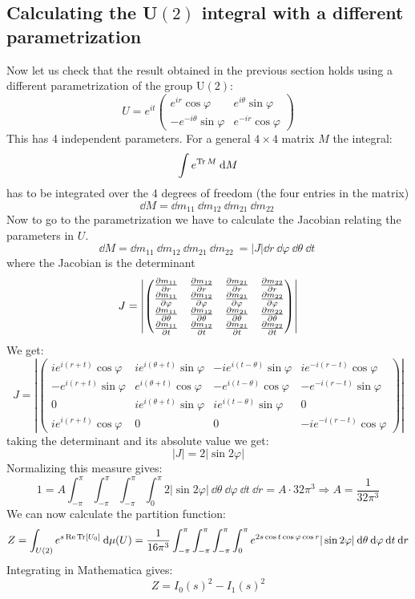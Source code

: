 \documentclass[a4,10pt,titlepage]{article}
\renewcommand\[{\begin{equation*}}
\renewcommand\]{\end{equation*}}
\newcommand{\be}{\begin{equation}}
\newcommand{\ee}{\end{equation}}
\numberwithin{equation}{section}
\newcommand{\lp}{\left}
\newcommand{\rp}{\right}
\begin{document}
\subsection{Calculating the U$(2)$ integral with a different parametrization}
Now let us check that the result obtained in the previous section holds using a different parametrization of the group U$(2)$:
\be
U=e^{it}
\begin{pmatrix}
e^{ir}\cos\varphi & e^{i\theta}\sin\varphi \\
-e^{-i\theta}\sin\varphi  & e^{-ir}\cos\varphi
\end{pmatrix}
\ee
This has 4 independent parameters. For a general $4\times 4$ matrix $M$ the integral:
\[
\int e^{\Tr M}\: \dd M
\]
has to be integrated over the 4 degrees of freedom (the four entries in the matrix)
\[
\dd M=\dd m_{11}\:\dd m_{12}\:\dd m_{21}\:\dd m_{22}\:
\]
Now to go to the parametrization we have to calculate the Jacobian relating the parameters in $U$.
\be
\dd M=\dd m_{11}\:\dd m_{12}\:\dd m_{21}\:\dd m_{22}\:=|J|\dd r\:\dd \varphi\:\dd \theta \:\dd t\:
\ee
where the Jacobian is the determinant
\[
J=\lp| \begin{pmatrix}\pdv{m_{11}}{r} & \pdv{m_{12}}{r} & \pdv{m_{21}}{r} & \pdv{m_{22}}{r} \\
\pdv{m_{11}}{\varphi} & \pdv{m_{12}}{\varphi} & \pdv{m_{21}}{\varphi} & \pdv{m_{22}}{\varphi}
\\
\pdv{m_{11}}{\theta} & \pdv{m_{12}}{\theta} & \pdv{m_{21}}{\theta} & \pdv{m_{22}}{\theta}
\\
\pdv{m_{11}}{t} & \pdv{m_{12}}{t} & \pdv{m_{21}}{t} & \pdv{m_{22}}{t}
\end{pmatrix} \rp|
\]
We get:
\[
J=\lp| \begin{pmatrix}
ie^{i(r+t)}\cos \varphi &ie^{i(\theta+t)}\sin \varphi&-ie^{i(t-\theta)}\sin \varphi & ie^{-i(r-t)}\cos \varphi \\
-e^{i(r+t)}\sin{}\varphi & e^{i(\theta+t)}\cos \varphi & -e^{i(t-\theta)}\cos \varphi & -e^{-i(r-t)}\sin \varphi
\\
0 & ie^{i(\theta+t)}\sin \varphi & ie^{i(t-\theta)}\sin \varphi & 0
\\
ie^{i(r+t)}\cos \varphi & 0 & 0 & -ie^{-i(r-t)}\cos \varphi
\end{pmatrix} \rp|
\]
taking the determinant and its absolute value we get:
\be
|J|=2|\sin 2\varphi|
\ee
Normalizing this measure gives:
\[
1=A\int_{-\pi}^\pi \int_{-\pi}^\pi \int_{-\pi}^\pi \int_{0}^\pi 2|\sin 2\varphi|\:\dd\theta\:\dd\varphi\:\dd t \:\dd r=A\cdot32\pi^3 \Rightarrow A=\frac{1}{32 \pi^3}
\]
We can now calculate the partition function:
\[
Z=\int_{U(2)} e^{s\Re\Tr[U_0]}\:\dd\mu(U)=\frac{1}{16\pi^3}\int_{-\pi}^\pi \int_{-\pi}^\pi \int_{-\pi}^\pi \int_{0}^\pi e^{2s\cos t\cos \varphi \cos r}|\sin 2\varphi|\:\dd\theta\:\dd\varphi\:\dd t \:\dd r
\]
Integrating in Mathematica gives:
\be
Z=I_0(s)^2-I_1(s)^2
\ee
\end{document}
